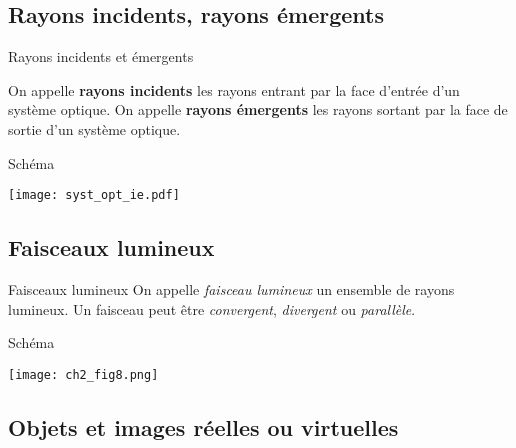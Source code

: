 \documentclass[../main/main.tex]{subfiles}
\begin{document}
\subsection{Rayons incidents, rayons émergents}

\begin{tcbraster}[raster columns=2, raster equal height=rows]
    
    \begin{defi}[label=def:rlie]{Rayons incidents et émergents}
    
        On appelle \textbf{rayons incidents} les rayons entrant par la face
        d'entrée d'un système optique. On appelle \textbf{rayons émergents} les
        rayons sortant par la face de sortie d'un système optique.
    
    \end{defi}
    \begin{NCexem}[width=\linewidth]{Schéma}
        \begin{center}
            \texttt{[image: syst\_opt\_ie.pdf]}
            \label{fig:socent}
        \end{center}
    \end{NCexem}
\end{tcbraster}

\subsection{Faisceaux lumineux}

\begin{tcbraster}[raster columns=4, raster equal height=rows]
    \begin{defi}[label=def:faisceau]{Faisceaux lumineux}
        On appelle \textit{faisceau lumineux} un ensemble de rayons lumineux. Un
        faisceau peut être \textit{convergent}, \textit{divergent} ou
        \textit{parallèle}.
    \end{defi}    
    \begin{NCexem}[raster multicolumn=3]{Schéma}
        \begin{center}
            \texttt{[image: ch2\_fig8.png]}
            \label{fig:faisceau}
        \end{center}
    \end{NCexem}
\end{tcbraster}

\subsection{Objets et images réelles ou virtuelles}
\end{document}
